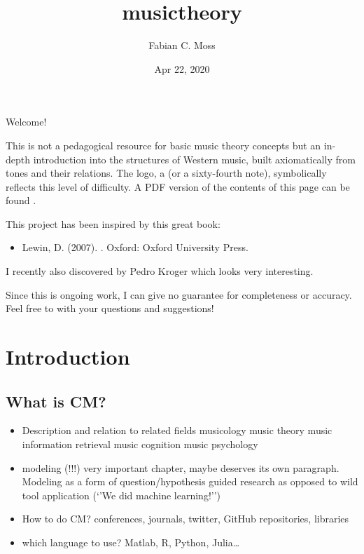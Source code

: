 \documentclass[letterpaper,10pt,english]{sphinxmanual}
\title{musictheory}
\date{Apr 22, 2020}
\author{Fabian C.\@{} Moss}
\begin{document}
\pagestyle{empty}
\sphinxmaketitle
\pagestyle{plain}
\sphinxtableofcontents
\pagestyle{normal}
\label{\detokenize{index::doc}}


Welcome!

This is not a pedagogical resource for basic music theory concepts
but an in-depth introduction into the structures of Western music,
built axiomatically from tones and their relations.
The logo, a  (or a sixty-fourth note),
symbolically reflects this level of difficulty. A PDF version of the contents
of this page can be found .

This project has been inspired by this great book:
\begin{itemize}
\item {} 
Lewin, D. (2007). .
Oxford: Oxford University Press.

\end{itemize}

I recently also discovered  by Pedro Kroger
which looks very interesting.

Since this is ongoing work, I can give no guarantee for completeness or accuracy.
Feel free to  with your questions and suggestions!


\chapter{Introduction}
\label{\detokenize{0_intro:introduction}}\label{\detokenize{0_intro::doc}}

\section{What is CM?}
\label{\detokenize{0_intro:what-is-cm}}\begin{itemize}
\item {} 
Description and relation to related fields
\textendash{} musicology
\textendash{} music theory
\textendash{} music information retrieval
\textendash{} music cognition
\textendash{} music psychology

\item {} 
modeling (!!!) very important chapter, maybe deserves its own paragraph. Modeling as a form of question/hypothesis guided research as opposed to wild tool application (‘’We did machine learning!’’)

\item {} 
How to do CM? conferences, journals, twitter, GitHub repositories, libraries

\item {} 
which language to use? Matlab, R, Python, Julia…

\end{itemize}
\end{document}
